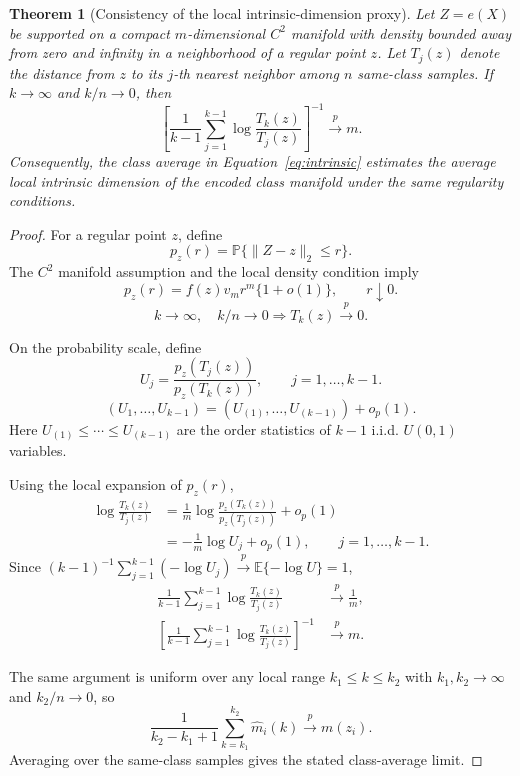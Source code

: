 \documentclass[preprint,12pt,number]{elsarticle}
\newtheorem{theorem}{Theorem}
\begin{document}
\begin{theorem}[Consistency of the local intrinsic-dimension proxy]
	Let $Z=e(X)$ be supported on a compact $m$-dimensional $C^2$ manifold with density bounded away from zero and infinity in a neighborhood of a regular point $z$. Let $T_j(z)$ denote the distance from $z$ to its $j$-th nearest neighbor among $n$ same-class samples. If $k\rightarrow\infty$ and $k/n\rightarrow 0$, then
	\[
	\left[\frac{1}{k-1}\sum_{j=1}^{k-1}\log\frac{T_k(z)}{T_j(z)}\right]^{-1}
	\stackrel{p}{\longrightarrow} m.
	\]
	Consequently, the class average in Equation~\ref{eq:intrinsic} estimates the average local intrinsic dimension of the encoded class manifold under the same regularity conditions.
\end{theorem}

\begin{proof}
	For a regular point $z$, define
	\[
	p_z(r)=\mathbb{P}\{\lVert Z-z\rVert_2\le r\}.
	\]
	The $C^2$ manifold assumption and the local density condition imply
	\[
	p_z(r)=f(z)v_m r^m\{1+o(1)\},
	\qquad
	r\downarrow0.
	\]
	\[
	k\rightarrow\infty,\quad k/n\rightarrow0
	\Longrightarrow
	T_k(z)\stackrel{p}{\longrightarrow}0.
	\]

	On the probability scale, define
	\[
	U_j
	=
	\frac{p_z(T_j(z))}{p_z(T_k(z))},
	\qquad
	j=1,\ldots,k-1.
	\]
	\[
	(U_1,\ldots,U_{k-1})
	=
	(U_{(1)},\ldots,U_{(k-1)})+o_p(1).
	\]
	Here $U_{(1)}\le\cdots\le U_{(k-1)}$ are the order statistics of $k-1$ i.i.d. $U(0,1)$ variables.

	Using the local expansion of $p_z(r)$,
	\[
	\begin{aligned}
	\log\frac{T_k(z)}{T_j(z)}
	&=
	\frac{1}{m}
	\log\frac{p_z(T_k(z))}{p_z(T_j(z))}
	+o_p(1)\\
	&=
	-\frac{1}{m}\log U_j+o_p(1),
	\qquad j=1,\ldots,k-1 .
	\end{aligned}
	\]
	Since $(k-1)^{-1}\sum_{j=1}^{k-1}(-\log U_j)\stackrel{p}{\to}\mathbb{E}\{-\log U\}=1$,
	\[
	\begin{aligned}
	\frac{1}{k-1}\sum_{j=1}^{k-1}\log\frac{T_k(z)}{T_j(z)}
	&\stackrel{p}{\longrightarrow}
	\frac{1}{m},\\
	\left[
	\frac{1}{k-1}\sum_{j=1}^{k-1}\log\frac{T_k(z)}{T_j(z)}
	\right]^{-1}
	&\stackrel{p}{\longrightarrow}
	m .
	\end{aligned}
	\]

	The same argument is uniform over any local range $k_1\le k\le k_2$ with $k_1,k_2\to\infty$ and $k_2/n\to0$, so
	\[
	\frac{1}{k_2-k_1+1}
	\sum_{k=k_1}^{k_2}\widehat m_i(k)
	\stackrel{p}{\longrightarrow}
	m(z_i).
	\]
	Averaging over the same-class samples gives the stated class-average limit.
\end{proof}
\end{document}
